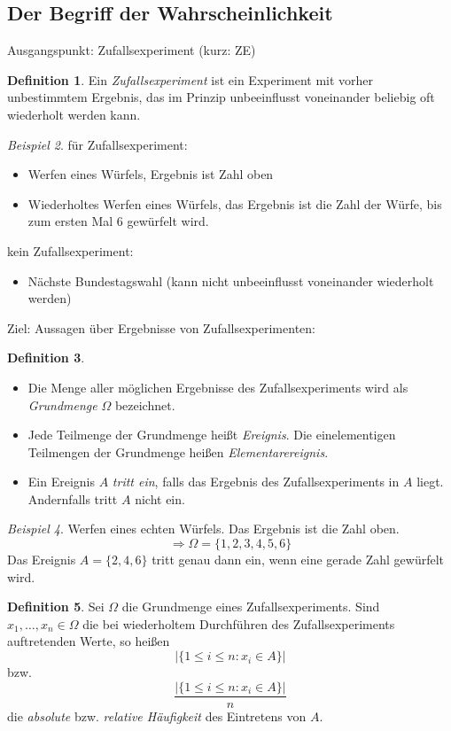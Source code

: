 \documentclass[a4paper,12pt,fleqn]{scrartcl}
\newcommand{\ZE}{Zufallsexperiment}
\newcommand{\impl}{\Rightarrow}
\theoremstyle{definition}
\newtheorem{definition}{Definition}[section]
\theoremstyle{plain}
\theoremstyle{remark}
\newtheorem{beispiel}[definition]{Beispiel}
\begin{document}
\subsection{Der Begriff der Wahrscheinlichkeit}
Ausgangspunkt: Zufallsexperiment (kurz: ZE)
\begin{definition}
Ein \emph{Zufallsexperiment} ist ein Experiment mit vorher unbestimmtem Ergebnis, das im Prinzip unbeeinflusst voneinander beliebig oft wiederholt werden kann.
\end{definition}
\begin{beispiel}
für \ZE:
\begin{itemize}
\item Werfen eines Würfels, Ergebnis ist Zahl oben
\item Wiederholtes Werfen eines Würfels, das Ergebnis ist die Zahl der Würfe, bis zum ersten Mal $6$ gewürfelt wird.
\end{itemize}
kein \ZE:
\begin{itemize}
\item Nächste Bundestagswahl (kann nicht unbeeinflusst voneinander wiederholt werden)
\end{itemize}
\end{beispiel}
Ziel: Aussagen über Ergebnisse von \ZE en:
\begin{definition}
\begin{itemize}
\item Die Menge aller möglichen Ergebnisse des \ZE s wird als \emph{Grundmenge} $\Omega$ bezeichnet.
\item Jede Teilmenge der Grundmenge heißt \emph{Ereignis}. Die einelementigen Teilmengen der Grundmenge heißen \emph{Elementarereignis}.
\item Ein Ereignis $A$ \emph{tritt ein}, falls das Ergebnis des Zufallsexperiments in $A$ liegt. Andernfalls tritt $A$ nicht ein.
\end{itemize}
\end{definition}
\begin{beispiel}
Werfen eines echten Würfels. Das Ergebnis ist die Zahl oben.
\[\impl\Omega=\{ 1,2,3,4,5,6\}\]
Das Ereignis $A=\{ 2,4,6\}$ tritt genau dann ein, wenn eine gerade Zahl gewürfelt wird.
\end{beispiel}
\begin{definition}
Sei $\Omega$ die Grundmenge eines \ZE s. Sind $x_1,\ldots,x_n\in\Omega$ die bei wiederholtem Durchführen des \ZE s auftretenden Werte, so heißen
\[| \{ 1\leq i\leq n:x_i\in A\}|\]
bzw.
\[\frac{| \{ 1\leq i\leq n:x_i\in A\}|}{n}\]
die \emph{absolute} bzw. \emph{relative Häufigkeit} des Eintretens von $A$.
\end{definition}
\end{document}
